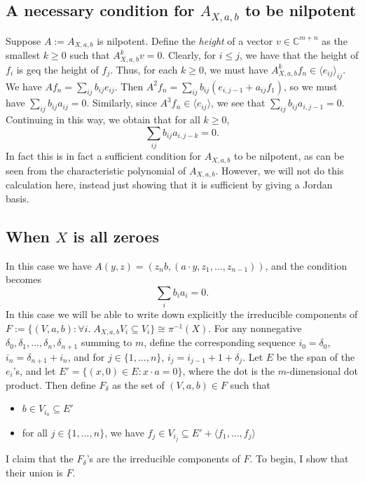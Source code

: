 \documentclass[12pt,psamsfonts]{article}
\begin{document}
\subsection{A necessary condition for \(A_{X, a, b}\) to be nilpotent}
Suppose \(A := A_{X, a, b}\) is nilpotent.
Define the \emph{height} of a vector \(v \in \mathbb{C}^{m + n}\) as the smallest \(k \geq 0\) such that \(A_{X, a, b}^k v = 0\).
Clearly, for \(i \leq j\), we have that the height of \(f_i\) is geq the height of \(f_j\).
Thus, for each \(k \geq 0\), we must have \(A_{X, a, b}^k f_n \in \langle e_{ij} \rangle_{ij}\).
We have \(Af_n = \sum_{ij} b_{ij} e_{ij}\).
Then \(A^2 f_n = \sum_{ij} b_{ij} (e_{i, j - 1} + a_{ij} f_1)\), so we must have \(\sum_{ij} b_{ij} a_{ij} = 0\).
Similarly, since \(A^3 f_n \in \langle e_{ij}\rangle\), we see that \(\sum_{ij} b_{ij} a_{i, j - 1} = 0\).
Continuing in this way, we obtain that for all \(k \geq 0\),
\begin{equation}\label{ab_nilp}\sum_{ij} b_{ij} a_{i,j - k} = 0.\end{equation}
In fact this is in fact a sufficient condition for \(A_{X, a, b}\) to be nilpotent, as can be seen from the characteristic polynomial of \(A_{X, a, b}\).
However, we will not do this calculation here, instead just showing that it is sufficient by giving a Jordan basis.

\subsection{When \(X\) is all zeroes}
In this case we have \(A(y, z) = (z_n b, (a \cdot y, z_1, ..., z_{n - 1}))\), and the condition becomes
\[\sum_i b_i a_i = 0.\]
In this case we will be able to write down explicitly the irreducible components of \(F := \{(V, a, b) : \forall i. \; A_{X, a, b} V_i \subseteq V_i\} \cong \pi^{-1}(X)\).
For any nonnegative \(\delta_0, \delta_1, ..., \delta_n, \delta_{n + 1}\) summing to \(m\), define the corresponding sequence \(i_0 = \delta_0\), \(i_n = \delta_{n + 1} + i_n\), and for \(j \in \{1, ..., n\}\), \(i_j = i_{j - 1} + 1 + \delta_j\).
Let \(E\) be the span of the \(e_i\)'s, and let \(E' = \{(x, 0) \in E : x \cdot a = 0\}\), where the dot is the \(m\)-dimensional dot product.
Then define \(F_\delta\) as the set of \((V, a, b) \in F\) such that 
\begin{itemize}
    \item \(b \in V_{i_0} \subseteq E'\)
    \item for all \(j \in \{1, ..., n\}\), we have \(f_j \in V_{i_j} \subseteq E' + \langle f_1, ..., f_j \rangle\)
\end{itemize}
I claim that the \(F_\delta\)'s are the irreducible components of \(F\).
To begin, I show that their union is \(F\).
\end{document}
